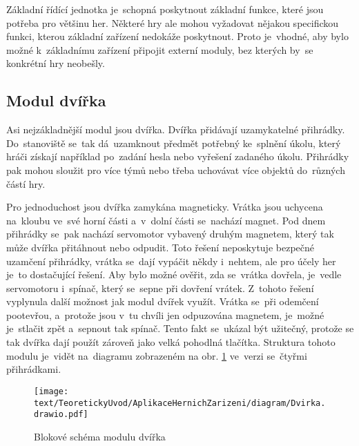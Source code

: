 Základní řídící jednotka je~schopná poskytnout základní funkce, které jsou potřeba pro většinu her.
Některé hry ale mohou vyžadovat nějakou specifickou funkci, kterou základní zařízení nedokáže poskytnout.
Proto je~vhodné, aby bylo možné k~základnímu zařízení připojit externí moduly, bez kterých by~se konkrétní hry neobešly.

\subsection{Modul dvířka}
Asi nejzákladnější modul jsou dvířka.
Dvířka přidávají uzamykatelné přihrádky.
Do~stanoviště se~tak dá~uzamknout předmět potřebný ke~splnění úkolu, který hráči získají například po~zadání hesla nebo vyřešení zadaného úkolu.
Přihrádky pak mohou sloužit pro více týmů nebo třeba uchovávat více objektů do~různých částí hry.

Pro jednoduchost jsou dvířka zamykána magneticky.
Vrátka jsou uchycena \\ na~kloubu ve~své horní části a~v~dolní části se~nachází magnet.
Pod dnem přihrádky se~pak nachází servomotor vybavený druhým magnetem, který tak může dvířka přitáhnout nebo odpudit.
Toto řešení neposkytuje bezpečné uzamčení přihrádky, vrátka se~dají vypáčit někdy i~nehtem, ale pro účely her je~to dostačující řešení.
Aby bylo možné ověřit, zda se~vrátka dovřela, je~vedle servomotoru i~spínač, který se~sepne při dovření vrátek.
Z~tohoto řešení vyplynula další možnost jak modul dvířek využít.
Vrátka se~při odemčení pootevřou, a~protože jsou v~tu chvíli jen odpuzována magnetem, je~možné je~stlačit zpět a~sepnout tak spínač.
Tento fakt se~ukázal být užitečný, protože se tak dvířka dají použít zároveň jako velká pohodlná tlačítka.
Struktura tohoto modulu je~vidět na~diagramu zobrazeném na obr. \ref{fig:diagram_dvirka} ve~verzi se~čtyřmi přihrádkami.

\begin{figure}[h]
    \centering
    \texttt{[image: text/TeoretickyUvod/AplikaceHernichZarizeni/diagram/Dvirka.drawio.pdf]}
    \caption{Blokové schéma modulu dvířka}
    \label{fig:diagram_dvirka}
\end{figure}
 
